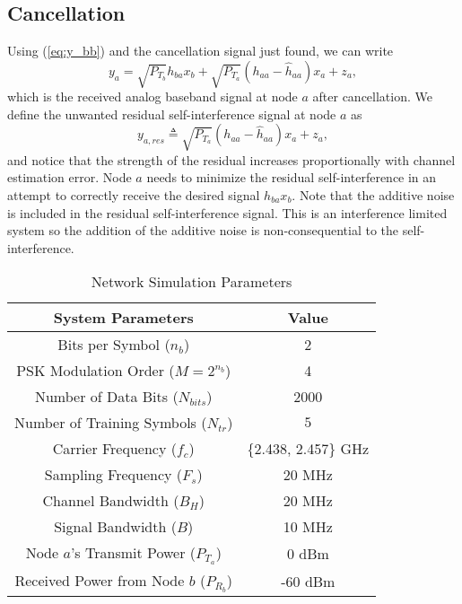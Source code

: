 \documentclass[12pt, journal,draftcls,letterpaper,onecolumn]{IEEEtran}
\begin{document}
\subsection{Cancellation}
Using (\ref{eq:y_bb}) and the cancellation signal just found, we can write
\begin{equation}
y_a = \sqrt{P_{T_b}}h_{ba}x_b + \sqrt{P_{T_a}}(h_{aa} -\widehat{h}_{aa}) x_{a} + z_a, \label{eq:y_a}
\end{equation}
which is the received analog baseband signal at node $a$ after cancellation.  We define the unwanted residual self-interference signal at node $a$ as
\begin{equation}
y_{a,res} \triangleq \sqrt{P_{T_a}}(h_{aa} -\widehat{h}_{aa}) x_{a} + z_{a},
\label{eq:y_a_res}
\end{equation}
and notice that the strength of the residual increases proportionally with channel estimation error.  Node $a$ needs to minimize the residual self-interference in an attempt to correctly receive the desired signal $h_{ba}x_b$.  Note that the additive noise is included in the residual self-interference signal.  This is an interference limited system so the addition of the additive noise is non-consequential to the self-interference.  
\begin{table}[h]
\begin{center}  
\caption{Network Simulation Parameters} 
\centering 
\begin{tabular}{|c||c|} 
\hline   
\textbf{System Parameters} & \textbf{Value} \\   
\hline\hline 
Bits per Symbol ($n_b$)& 2\\
\hline
PSK Modulation Order ($M = 2^{n_b}$)& 4 \\
\hline
Number of Data Bits ($N_{bits}$) & 2000\\ 
\hline
Number of Training Symbols ($N_{tr}$)& $5$\\ 
\hline
Carrier Frequency ($f_c$)& \{2.438, 2.457\} GHz  \\
\hline
Sampling Frequency ($F_s$)& 20 MHz  \\
\hline
Channel Bandwidth ($B_H$)& 20 MHz  \\
\hline
Signal Bandwidth ($B$)& 10 MHz\\
\hline
Node $a$'s Transmit Power ($P_{T_a}$)& 0 dBm\\
\hline
Received Power from Node $b$ ($P_{R_b}$)& -60 dBm\\
\hline 
\end{tabular} 
\label{table:vars}  
\end{center}
\end{table} 
\end{document}
